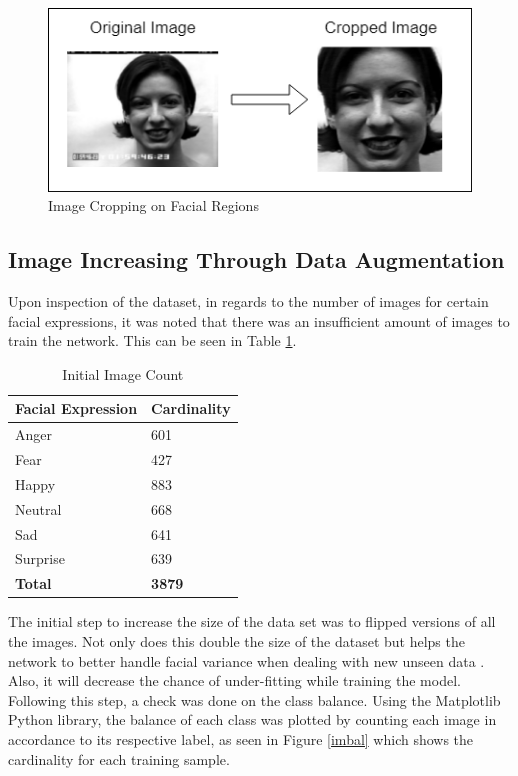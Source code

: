 \begin{figure}[ht]
	\begin{center}
		\advance\leftskip-3cm
		\advance\rightskip-3cm
		\includegraphics[keepaspectratio=true,scale=0.9]{__resources/DATASET/crop.png}
		\caption{Image Cropping on Facial Regions}
		\label{crop}
	\end{center}
\end{figure}
\newpage


\subsection{Image Increasing Through Data Augmentation}
Upon inspection of the dataset, in regards to the number of images for certain facial expressions, it was noted that there was an insufficient amount of images to train the network. This can be seen in Table \ref{table: count}. 
\begin{table}[ht]
	\begin{tabular}{ |p{10cm}||p{3cm}|}
		\hline
		\textbf{Facial Expression} & \textbf{Cardinality}\\
		\hline
		\hline
		Anger & 601 \\
		\hline
		Fear & 427	\\
		\hline
		Happy & 883\\
		\hline
		Neutral & 668\\
		\hline
		Sad & 641	\\
		\hline
		Surprise  & 639	\\
		\hline
		\textbf{Total}  & \textbf{3879}	\\
		\hline
	\end{tabular}
	\caption{Initial Image Count}
	\label{table: count}
\end{table}

The initial step to increase the size of the data set was to flipped versions of all the images. Not only does this double the size of the dataset but helps the network to better handle facial variance when dealing with new unseen data \citep{LOPES}. Also, it will decrease the chance of under-fitting while training the model. Following this step, a check was done on the class balance. Using the Matplotlib Python library, the balance of each class was plotted by counting each image in accordance to its respective label, as seen in Figure \ref{imbal} which shows the cardinality for each training sample.

